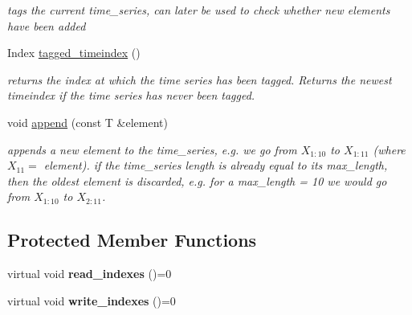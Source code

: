 \begin{DoxyCompactItemize}
\begin{DoxyCompactList}\small\item\em tags the current time\+\_\+series, can later be used to check whether new elements have been added \end{DoxyCompactList}\item 
Index \hyperlink{classtime__series_1_1internal_1_1TimeSeriesBase_adadeeff6e42776853e26aa5f74264909}{tagged\+\_\+timeindex} ()\hypertarget{classtime__series_1_1internal_1_1TimeSeriesBase_adadeeff6e42776853e26aa5f74264909}{}\label{classtime__series_1_1internal_1_1TimeSeriesBase_adadeeff6e42776853e26aa5f74264909}

\begin{DoxyCompactList}\small\item\em returns the index at which the time series has been tagged. Returns the newest timeindex if the time series has never been tagged. \end{DoxyCompactList}\item 
void \hyperlink{classtime__series_1_1internal_1_1TimeSeriesBase_a09293ae95cdc492e7de78729b0e0e398}{append} (const T \&element)\hypertarget{classtime__series_1_1internal_1_1TimeSeriesBase_a09293ae95cdc492e7de78729b0e0e398}{}\label{classtime__series_1_1internal_1_1TimeSeriesBase_a09293ae95cdc492e7de78729b0e0e398}

\begin{DoxyCompactList}\small\item\em appends a new element to the time\+\_\+series, e.\+g. we go from $ X_{1:10} $ to $ X_{1:11} $ (where $ X_{11}=$ element). if the time\+\_\+series length is already equal to its max\+\_\+length, then the oldest element is discarded, e.\+g. for a max\+\_\+length = 10 we would go from $ X_{1:10} $ to $ X_{2:11} $. \end{DoxyCompactList}\end{DoxyCompactItemize}
\subsection*{Protected Member Functions}
\begin{DoxyCompactItemize}
\item 
virtual void {\bfseries read\+\_\+indexes} ()=0\hypertarget{classtime__series_1_1internal_1_1TimeSeriesBase_a1f379b0886fe36f5a7ea99ebb56a3bbf}{}\label{classtime__series_1_1internal_1_1TimeSeriesBase_a1f379b0886fe36f5a7ea99ebb56a3bbf}

\item 
virtual void {\bfseries write\+\_\+indexes} ()=0\hypertarget{classtime__series_1_1internal_1_1TimeSeriesBase_ae45f307ebdfe4508fa342a6a259aea38}{}\label{classtime__series_1_1internal_1_1TimeSeriesBase_ae45f307ebdfe4508fa342a6a259aea38}

\end{DoxyCompactItemize}
